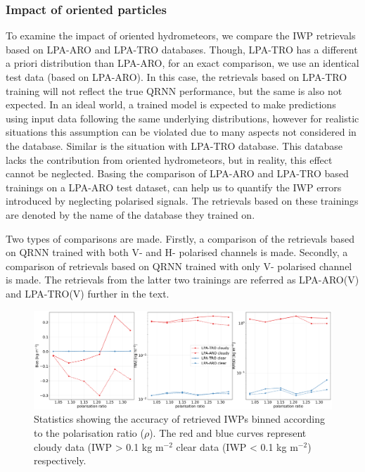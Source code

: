 \documentclass[amt, manuscript]{copernicus}
\begin{document}
\subsubsection{Impact of oriented particles}
\label{sec:impact_retrieval}
%
To examine the impact of oriented hydrometeors, we compare the IWP retrievals based on LPA-ARO and LPA-TRO databases. Though, LPA-TRO has a different a priori distribution than LPA-ARO, for an exact comparison, we use an identical test data (based on LPA-ARO). In this case, the retrievals based on LPA-TRO training will not reflect the true QRNN performance, but the same is also not expected. In an ideal world, a trained model is expected to make predictions using input data following the same underlying distributions, however for realistic situations this assumption can be violated due to many aspects not considered in the database. Similar is the situation with LPA-TRO database. This database lacks the contribution from oriented hydrometeors, but in reality, this effect cannot be neglected. Basing the comparison of LPA-ARO and LPA-TRO based trainings on a LPA-ARO test dataset, can help us to quantify the IWP errors introduced by neglecting polarised signals. The retrievals based on these trainings are denoted by the name of the database they trained on.

Two types of comparisons are made. Firstly, a comparison of the retrievals based on QRNN trained with both V- and H- polarised channels  is made. Secondly, a comparison of retrievals based on QRNN trained with only V- polarised channel is made. The retrievals from the latter two trainings are referred as LPA-ARO(V) and LPA-TRO(V) further in the text.  


\begin{figure}[t]
	\includegraphics[width=12cm]{Figures/statistics_cloudyclear.pdf}
	\caption{Statistics showing the accuracy of retrieved IWPs
		binned according to the polarisation ratio ($\rho$). The red and blue curves represent cloudy data (IWP > 0.1\,\,kg m$^{-2}$
		clear data (IWP < 0.1\,\,kg m$^{-2}$) respectively.}
	\label{fig:clear_cloudy}
\end{figure}
\end{document}
